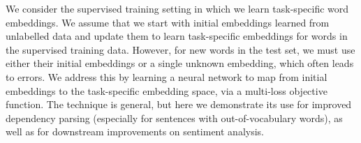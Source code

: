 We consider the supervised training setting in which we learn task-specific word embeddings. We assume that we start with initial embeddings learned from unlabelled data and update them to learn task-specific embeddings for words in the supervised training data. However, for new words in the test set, we must use either their initial embeddings or a single unknown embedding, which often leads to errors. We address this by learning a neural network to map from initial embeddings to the task-specific embedding space, via a multi-loss objective function. The technique is general, but here we demonstrate its use for improved dependency parsing (especially for sentences with out-of-vocabulary words), as well as for downstream improvements on sentiment analysis.
